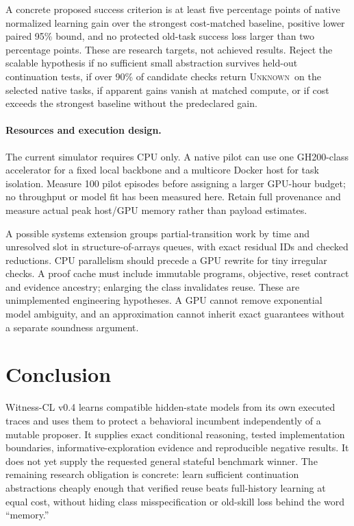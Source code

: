 \documentclass[10pt,twocolumn]{article}
\newcommand{\unk}{\textsc{Unknown}}
\begin{document}
A concrete proposed success criterion is at least five percentage points of
native normalized learning gain over the strongest cost-matched baseline,
positive lower paired 95\% bound, and no protected old-task success loss larger
than two percentage points. These are research targets, not achieved results.
Reject the scalable hypothesis if no sufficient small abstraction survives
held-out continuation tests, if over 90\% of candidate checks return \unk\ on
the selected native tasks, if apparent gains vanish at matched compute, or if
cost exceeds the strongest baseline without the predeclared gain.

\paragraph{Resources and execution design.}
The current simulator requires CPU only. A native pilot can use one GH200-class
accelerator for a fixed local backbone and a multicore Docker host for task
isolation. Measure 100 pilot episodes before assigning a larger GPU-hour budget;
no throughput or model fit has been measured here. Retain full provenance and
measure actual peak host/GPU memory rather than payload estimates.

A possible systems extension groups partial-transition work by time and
unresolved slot in structure-of-arrays queues, with exact residual IDs and
checked reductions. CPU parallelism should precede a GPU rewrite for tiny
irregular checks. A proof cache must include immutable programs, objective,
reset contract and evidence ancestry; enlarging the class invalidates reuse.
These are unimplemented engineering hypotheses. A GPU cannot remove exponential
model ambiguity, and an approximation cannot inherit exact guarantees without
a separate soundness argument.

\section{Conclusion}
Witness-CL v0.4 learns compatible hidden-state models from its own executed traces
and uses them to protect a behavioral incumbent independently of a mutable
proposer. It supplies exact conditional reasoning, tested implementation
boundaries, informative-exploration evidence and reproducible negative results.
It does not yet supply the requested general stateful benchmark winner. The
remaining research obligation is concrete: learn sufficient continuation
abstractions cheaply enough that verified reuse beats full-history learning at
equal cost, without hiding class misspecification or old-skill loss behind the
word ``memory.''
\end{document}
